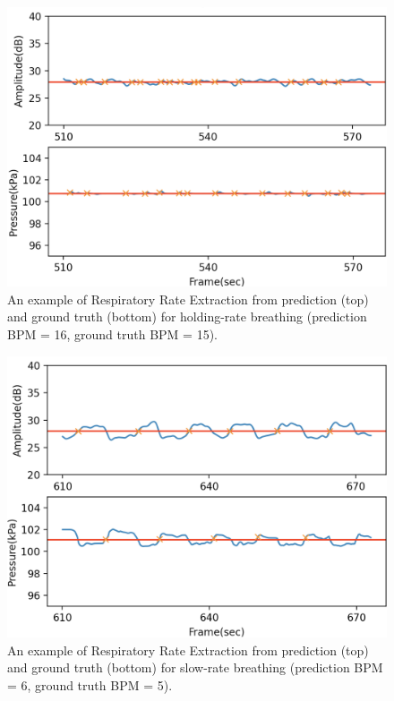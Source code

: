 \documentclass[10pt,letterpaper]{article}
\begin{document}
\begin{figure}[htbp]
	\centerline{\includegraphics[width=120mm,scale=0.9]{PD2GT_HOLD02.png}}
	\caption{An example of Respiratory Rate Extraction from prediction (top) and ground truth (bottom) for holding-rate breathing (prediction BPM = 16, ground truth BPM = 15).}
	\label{fig:RREXT_HOLD}
\end{figure}
\begin{figure}[htbp]
	\centerline{\includegraphics[width=120mm,scale=0.9]{PD2GT_SLOW02.png}}
	\caption{An example of Respiratory Rate Extraction from prediction (top) and ground truth (bottom) for slow-rate breathing (prediction BPM = 6, ground truth BPM = 5).}
	\label{fig:RREXT_SLOW}
\end{figure}
	
	

	

	
\end{document}
